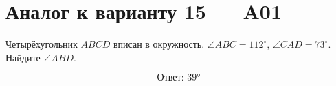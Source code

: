 


\section*{Аналог к варианту 15 — A01}
Четырёхугольник \(ABCD\) вписан в окружность. \(\angle ABC=112^\circ\), \(\angle CAD=73^\circ\). Найдите \(\angle ABD\).
\begin{center}\figCyclicChord\end{center}
\[\boxed{\text{Ответ: }39°}\]

